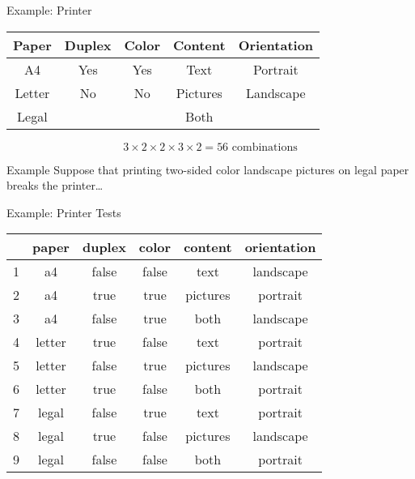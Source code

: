 \documentclass[xcolor=table,dvipsnames]{beamer}
\begin{document}
  \begin{frame}{Example: Printer}\pause
    
    \begin{center}
    \begin{tabular}{ccccc}
      Paper & Duplex & Color & Content & Orientation \\ 
      \hline 
      A4     & Yes    & Yes   & Text     & Portrait \\
      Letter & No     & No    & Pictures & Landscape \\
      Legal  &        &       & Both     &          \\
    \end{tabular}
    \end{center}

    \pause 

    $$ 3 \times 2 \times 2 \times 3 \times 2 = 56 \text{ combinations}$$

    \pause 
    \begin{block}{Example}
      Suppose that printing two-sided color landscape pictures on legal paper
      breaks the printer\ldots
    \end{block}
  \end{frame}

  \begin{frame}{Example: Printer Tests} 
    \begin{center}
    \begin{tabular}{c|ccccc}
      & paper  & duplex& color & content  & orientation \\
      \hline
      1 & a4     & false & false & text     & landscape \\
      2 & a4     & true  & true  & pictures & portrait \\
      3 & a4     & false & true  & both     & landscape \\
      4 & letter & true  & false & text     & portrait \\
      5 & letter & false & true  & pictures & landscape \\
      6 & letter & true  & false & both     & portrait \\
      7 & legal  & false & true  & text     & portrait  \\
      8 & legal  & true  & false & pictures & landscape  \\ 
      9 & legal  & false & false & both     & portrait \\
    \end{tabular}
    \end{center}
  \end{frame}
\end{document}
